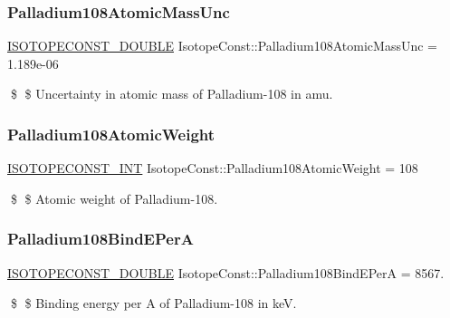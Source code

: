 \subsubsection{\texorpdfstring{Palladium108\+Atomic\+Mass\+Unc}{Palladium108AtomicMassUnc}}
{\footnotesize\ttfamily \mbox{\hyperlink{group___isotope_const-_macros_ga8f45a7272ce02c0b4c65c44636ed719a}{I\+S\+O\+T\+O\+P\+E\+C\+O\+N\+S\+T\+\_\+\+D\+O\+U\+B\+LE}} Isotope\+Const\+::\+Palladium108\+Atomic\+Mass\+Unc = 1.\+189e-\/06}

\$ \$ Uncertainty in atomic mass of Palladium-\/108 in amu. \mbox{\label{group___isotope_const-_palladium-_pd108_ga8c3a585e456622df15ea3f302b5b0c2b}} 
\subsubsection{\texorpdfstring{Palladium108\+Atomic\+Weight}{Palladium108AtomicWeight}}
{\footnotesize\ttfamily \mbox{\hyperlink{group___isotope_const-_macros_ga5f18360b3e99483a35c32d789e62621c}{I\+S\+O\+T\+O\+P\+E\+C\+O\+N\+S\+T\+\_\+\+I\+NT}} Isotope\+Const\+::\+Palladium108\+Atomic\+Weight = 108}

\$ \$ Atomic weight of Palladium-\/108. \mbox{\label{group___isotope_const-_palladium-_pd108_ga4c73a48bd86e2b088756a4b0beb7cdf0}} 
\subsubsection{\texorpdfstring{Palladium108\+Bind\+E\+PerA}{Palladium108BindEPerA}}
{\footnotesize\ttfamily \mbox{\hyperlink{group___isotope_const-_macros_ga8f45a7272ce02c0b4c65c44636ed719a}{I\+S\+O\+T\+O\+P\+E\+C\+O\+N\+S\+T\+\_\+\+D\+O\+U\+B\+LE}} Isotope\+Const\+::\+Palladium108\+Bind\+E\+PerA = 8567.}

\$ \$ Binding energy per A of Palladium-\/108 in keV. \mbox{\label{group___isotope_const-_palladium-_pd108_ga11fe929f78c1579c6b0b8d8ea345a1b2}} 
